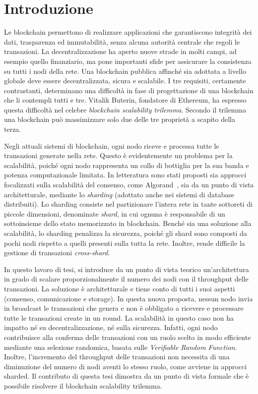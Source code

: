 \chapter{Introduzione}

Le blockchain permettono di realizzare applicazioni che garantiscono integrità dei dati, trasparenza ed immutabilità, senza alcuna autorità centrale che regoli le transazioni. La decentralizzazione ha aperto nuove strade in molti campi, ad esempio quello finanziario, ma pone importanti sfide per assicurare la consistenza su tutti i nodi della rete. Una blockchain pubblica affinché sia adottata a livello globale deve essere decentralizzata, sicura e scalabile. I tre requisiti, certamente contrastanti, determinano una difficoltà in fase di progettazione di una blockchain che li contempli tutti e tre. Vitalik Buterin, fondatore di Ethereum, ha espresso questa difficoltà nel celebre \textit{blockchain scalability trilemma}. Secondo il trilemma una blockchain può massimizzare solo due delle tre proprietà a scapito della terza.

Negli attuali sistemi di blockchain, ogni nodo riceve e processa tutte le transazioni generate nella rete. Questo è evidentemente un problema per la scalabilità, poiché ogni nodo rappresenta un collo di bottiglia per la sua banda e potenza computazionale limitata. In letteratura sono stati proposti sia approcci focalizzati sulla scalabilità del consenso, come Algorand~\cite{gilad2017algorand}, sia da un punto di vista architetturale, mediante lo \textit{sharding} (adottato anche nei sistemi di database distribuiti). Lo sharding consiste nel partizionare l'intera rete in tante sottoreti di piccole dimensioni, denominate \textit{shard}, in cui ognuna è responsabile di un sottoinsieme dello stato memorizzato in blockchain. Benché sia una soluzione alla scalabilità, lo sharding penalizza la sicurezza, poiché gli shard sono composti da pochi nodi rispetto a quelli presenti sulla tutta la rete. Inoltre, rende difficile la gestione di transazioni \textit{cross-shard}.

In questo lavoro di tesi, si introduce da un punto di vista teorico un'architettura in grado di scalare proporzionalmente il numero dei nodi con il throughput delle transazioni. La soluzione è architetturale e tiene conto di tutti i suoi aspetti (consenso, comunicazione e storage). In questa nuova proposta, nessun nodo invia in broadcast le transazioni che genera e non è obbligato a ricevere e processare tutte le transazioni create in un round. La scalabilità in questo caso non ha impatto né su decentralizzazione, né sulla sicurezza. Infatti, ogni nodo contribuisce alla conferma delle transazioni con un ruolo scelto in modo efficiente mediante una selezione randomica, basata sulle \textit{Verifiable Random Function}. Inoltre, l'incremento del throughput delle transazioni non necessita di una diminuzione del numero di nodi aventi lo stesso ruolo, come avviene in approcci sharded. Il contributo di questa tesi dimostra da un punto di vista formale che è possibile risolvere il blockchain scalability trilemma.

